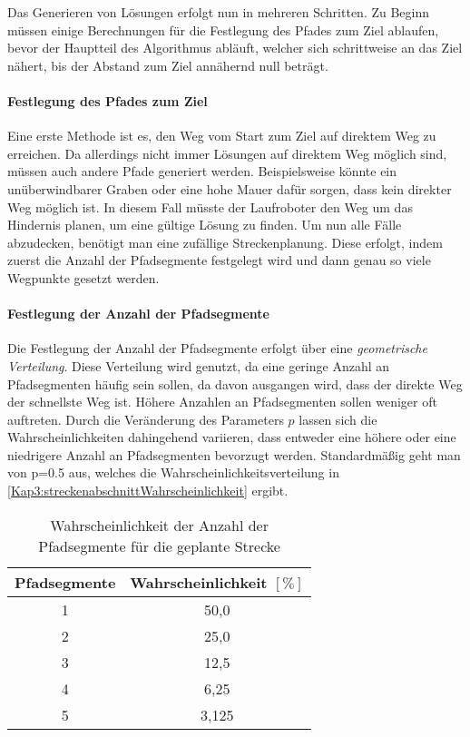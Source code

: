 Das Generieren von Lösungen erfolgt nun in mehreren Schritten. Zu Beginn müssen einige Berechnungen für die Festlegung des Pfades zum Ziel ablaufen, bevor der Hauptteil des Algorithmus abläuft, welcher sich schrittweise an das Ziel nähert, bis der Abstand zum Ziel annähernd null beträgt.

\paragraph{Festlegung des Pfades zum Ziel}

Eine erste Methode ist es, den Weg vom Start zum Ziel auf direktem Weg zu erreichen. Da allerdings nicht immer Lösungen auf direktem Weg möglich sind, müssen auch andere Pfade generiert werden. Beispielsweise könnte ein unüberwindbarer Graben oder eine hohe Mauer dafür sorgen, dass kein direkter Weg möglich ist. In diesem Fall müsste der Laufroboter den Weg um das Hindernis planen, um eine gültige Lösung zu finden. Um nun alle Fälle abzudecken, benötigt man eine zufällige Streckenplanung. Diese erfolgt, indem zuerst die Anzahl der Pfadsegmente festgelegt wird und dann genau so viele Wegpunkte gesetzt werden.

\paragraph{Festlegung der Anzahl der Pfadsegmente}

Die Festlegung der Anzahl der Pfadsegmente erfolgt über eine \emph{geometrische Verteilung}. Diese Verteilung wird genutzt, da eine geringe Anzahl an Pfadsegmenten häufig sein sollen, da davon ausgangen wird, dass der direkte Weg der schnellste Weg ist. Höhere Anzahlen an Pfadsegmenten sollen weniger oft auftreten. Durch die Veränderung des Parameters $p$ lassen sich die Wahrscheinlichkeiten dahingehend variieren, dass entweder eine höhere oder eine niedrigere Anzahl an Pfadsegmenten bevorzugt werden. Standardmäßig geht man von p=\SI{0.5}{} aus, welches die Wahrscheinlichkeitsverteilung in \autoref{Kap3:streckenabschnittWahrscheinlichkeit} ergibt.

\begin{table}[t]
  \caption{Wahrscheinlichkeit der Anzahl der Pfadsegmente für die geplante Strecke}
  \label{Kap3:streckenabschnittWahrscheinlichkeit}
  \centering
  \sffamily
  \begin{footnotesize}
    \begin{tabular}{c S[table-format=1.3,table-comparator=true,table-space-text-post={***}]}
    \toprule
    \textbf{Pfadsegmente} & \textbf{Wahrscheinlichkeit $[\%]$}\\
     & 50,0\\
    2 & 25,0\\
    3 & 12,5\\
    4 & 6,25\\
    5 & 3,125\\
    \bottomrule
    \end{tabular}
  \end{footnotesize}
  \rmfamily
\end{table}

